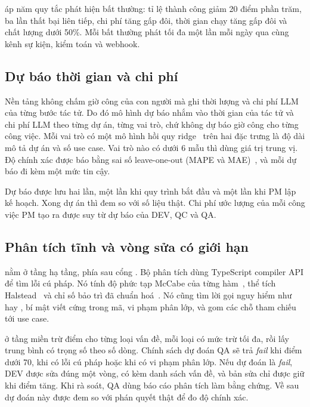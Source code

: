  áp năm quy tắc phát hiện bất thường: tỉ lệ thành công giảm 20 điểm phần trăm, ba lần thất bại liên tiếp, chi phí tăng gấp đôi, thời gian chạy tăng gấp đôi và chất lượng dưới 50\%. Mỗi bất thường phát tối đa một lần mỗi ngày qua cùng kênh sự kiện, kiểm toán và webhook.

\subsection{Dự báo thời gian và chi phí}

Nền tảng không chấm giờ công của con người mà ghi thời lượng và chi phí LLM của từng bước tác tử. Do đó mô hình dự báo nhắm vào thời gian của tác tử và chi phí LLM theo từng dự án, từng vai trò, chứ không dự báo giờ công cho từng công việc. Mỗi vai trò có một mô hình hồi quy ridge~\cite{hoerl1970} trên hai đặc trưng là độ dài mô tả dự án và số use case. Vai trò nào có dưới 6 mẫu thì dùng giá trị trung vị. Độ chính xác được báo bằng sai số leave-one-out (MAPE và MAE)~\cite{kohavi1995}, và mỗi dự báo đi kèm một mức tin cậy.

Dự báo được lưu hai lần, một lần khi quy trình bắt đầu và một lần khi PM lập kế hoạch. Xong dự án thì đem so với số liệu thật. Chi phí ước lượng của mỗi công việc PM tạo ra được suy từ dự báo của DEV, QC và QA.

\subsection{Phân tích tĩnh và vòng sửa có giới hạn}
\label{subsec:phan-tich-tinh}

 nằm ở tầng hạ tầng, phía sau cổng . Bộ phân tích dùng TypeScript compiler API để tìm lỗi cú pháp. Nó tính độ phức tạp McCabe của từng hàm~\cite{mccabe1976}, thể tích Halstead~\cite{halstead1977} và chỉ số bảo trì đã chuẩn hoá~\cite{oman1992,coleman1994}. Nó cũng tìm lời gọi nguy hiểm như  hay , bí mật viết cứng trong mã, vi phạm phân lớp, và gom các chỗ tham chiếu tới use case.

 ở tầng miền trừ điểm cho từng loại vấn đề, mỗi loại có mức trừ tối đa, rồi lấy trung bình có trọng số theo số dòng. Chính sách dự đoán QA sẽ trả \textit{fail} khi điểm dưới 70, khi có lỗi cú pháp hoặc khi có vi phạm phân lớp. Nếu dự đoán là \textit{fail}, DEV được sửa đúng một vòng, có kèm danh sách vấn đề, và bản sửa chỉ được giữ khi điểm tăng. Khi rà soát, QA dùng báo cáo phân tích làm bằng chứng. Về sau dự đoán này được đem so với phán quyết thật để đo độ chính xác.

